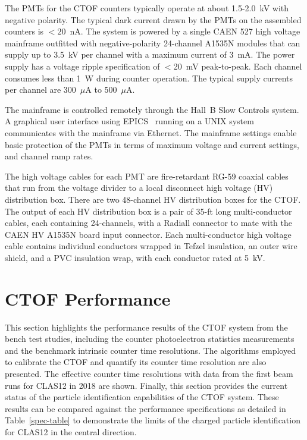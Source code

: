 \documentclass[3p,times,twocolumn]{elsarticle}
\begin{document}
The PMTs for the CTOF counters typically operate at about 1.5-2.0~kV with negative polarity. The typical
dark current drawn by the PMTs on the assembled counters is $<20$~nA. The system is powered by a
single CAEN 527 high voltage mainframe outfitted with negative-polarity 24-channel A1535N modules
that can supply up to 3.5~kV per channel with a maximum current of 3~mA. The power supply has a voltage
ripple specification of $<$20~mV peak-to-peak. Each channel consumes less than 1~W during counter
operation. The typical supply currents per channel are 300~$\mu$A to 500~$\mu$A.

The mainframe is controlled remotely through the Hall~B Slow Controls system. A graphical user interface
using EPICS~\cite{epics} running on a UNIX system communicates with the mainframe via Ethernet. The
mainframe settings enable basic protection of the PMTs in terms of maximum voltage and current settings,
and channel ramp rates.

The high voltage cables for each PMT are fire-retardant RG-59 coaxial cables that run from the voltage
divider to a local disconnect high voltage (HV) distribution box. There are two 48-channel HV distribution
boxes for the CTOF. The output of each HV distribution box is a pair of 35-ft long multi-conductor cables,
each containing 24-channels, with a Radiall connector to mate with the CAEN HV A1535N board input
connector. Each multi-conductor high voltage cable contains individual conductors wrapped in Tefzel
insulation, an outer wire shield, and a PVC insulation wrap, with each conductor rated at 5~kV.

\section{CTOF Performance}
\label{sec:performance}

This section highlights the performance results of the CTOF system from the bench test studies, including
the counter photoelectron statistics measurements and the benchmark intrinsic counter time resolutions. The
algorithms employed to calibrate the CTOF and quantify its counter time resolution are also presented. The
effective counter time resolutions with data from the first beam runs for CLAS12 in 2018 are shown. Finally,
this section provides the current status of the particle identification capabilities of the CTOF system.
These results can be compared against the performance specifications as detailed in Table~\ref{spec-table}
to demonstrate the limits of the charged particle identification for CLAS12 in the central direction. 
\end{document}
